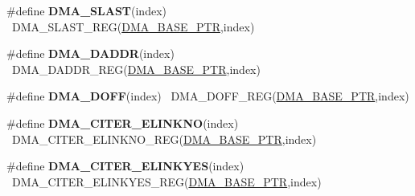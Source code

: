 \begin{DoxyCompactItemize}
\item 
\hypertarget{group___d_m_a___register___accessor___macros_gad1eed6259dace38627dd0748cfa7737b}{}\#define {\bfseries D\+M\+A\+\_\+\+S\+L\+A\+S\+T}(index)                                              ~D\+M\+A\+\_\+\+S\+L\+A\+S\+T\+\_\+\+R\+E\+G(\hyperlink{group___d_m_a___peripheral_ga6997fbc1b1973e9f27170217a3bd6f22}{D\+M\+A\+\_\+\+B\+A\+S\+E\+\_\+\+P\+T\+R},index)\label{group___d_m_a___register___accessor___macros_gad1eed6259dace38627dd0748cfa7737b}

\item 
\hypertarget{group___d_m_a___register___accessor___macros_ga800d00007406a53879d003ab8916d261}{}\#define {\bfseries D\+M\+A\+\_\+\+D\+A\+D\+D\+R}(index)                                              ~D\+M\+A\+\_\+\+D\+A\+D\+D\+R\+\_\+\+R\+E\+G(\hyperlink{group___d_m_a___peripheral_ga6997fbc1b1973e9f27170217a3bd6f22}{D\+M\+A\+\_\+\+B\+A\+S\+E\+\_\+\+P\+T\+R},index)\label{group___d_m_a___register___accessor___macros_ga800d00007406a53879d003ab8916d261}

\item 
\hypertarget{group___d_m_a___register___accessor___macros_gac2bcaf5073abb3c81279d62bb06a2e57}{}\#define {\bfseries D\+M\+A\+\_\+\+D\+O\+F\+F}(index)                                                ~D\+M\+A\+\_\+\+D\+O\+F\+F\+\_\+\+R\+E\+G(\hyperlink{group___d_m_a___peripheral_ga6997fbc1b1973e9f27170217a3bd6f22}{D\+M\+A\+\_\+\+B\+A\+S\+E\+\_\+\+P\+T\+R},index)\label{group___d_m_a___register___accessor___macros_gac2bcaf5073abb3c81279d62bb06a2e57}

\item 
\hypertarget{group___d_m_a___register___accessor___macros_ga29d14a0c7f3135e8aa771aa6dad9a71f}{}\#define {\bfseries D\+M\+A\+\_\+\+C\+I\+T\+E\+R\+\_\+\+E\+L\+I\+N\+K\+N\+O}(index)                              ~D\+M\+A\+\_\+\+C\+I\+T\+E\+R\+\_\+\+E\+L\+I\+N\+K\+N\+O\+\_\+\+R\+E\+G(\hyperlink{group___d_m_a___peripheral_ga6997fbc1b1973e9f27170217a3bd6f22}{D\+M\+A\+\_\+\+B\+A\+S\+E\+\_\+\+P\+T\+R},index)\label{group___d_m_a___register___accessor___macros_ga29d14a0c7f3135e8aa771aa6dad9a71f}

\item 
\hypertarget{group___d_m_a___register___accessor___macros_gab45e9f626a605ef2064a13e2ca620163}{}\#define {\bfseries D\+M\+A\+\_\+\+C\+I\+T\+E\+R\+\_\+\+E\+L\+I\+N\+K\+Y\+E\+S}(index)                            ~D\+M\+A\+\_\+\+C\+I\+T\+E\+R\+\_\+\+E\+L\+I\+N\+K\+Y\+E\+S\+\_\+\+R\+E\+G(\hyperlink{group___d_m_a___peripheral_ga6997fbc1b1973e9f27170217a3bd6f22}{D\+M\+A\+\_\+\+B\+A\+S\+E\+\_\+\+P\+T\+R},index)\label{group___d_m_a___register___accessor___macros_gab45e9f626a605ef2064a13e2ca620163}


\end{DoxyCompactItemize}
